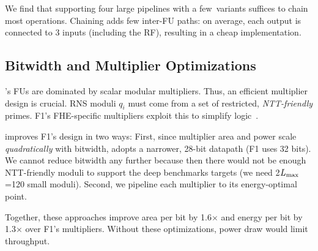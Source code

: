 We find that supporting four large pipelines with a few~variants suffices to chain most operations.
Chaining adds few inter-FU paths: on average, each output is connected to 3 inputs (including the RF),
resulting in a cheap implementation.



\subsection{Bitwidth and Multiplier Optimizations}\label{sec:bitwidth}

\name's FUs are dominated by scalar modular multipliers.
Thus, an efficient multiplier design is crucial.
RNS moduli $q_i$ must come from a set of restricted,
\emph{NTT-friendly} primes.
F1's FHE-specific multipliers exploit this to simplify logic~\cite{feldmann:micro21:f1}.

\name improves F1's design in two ways:
First, since multiplier area and power scale \emph{quadratically}
with bitwidth, \name adopts a narrower, 28-bit datapath (F1 uses 32 bits).
We cannot reduce bitwidth any further because then there would not be enough
NTT-friendly moduli to support the deep benchmarks \name targets
(we need 2$L_{\textrm{max}}$=120 small moduli).
Second, we pipeline each multiplier to its energy-optimal point.

Together, these approaches improve
area per bit by 1.6$\times$ and energy per bit by 1.3$\times$ over F1's multipliers.
Without these optimizations, power draw would limit throughput.

